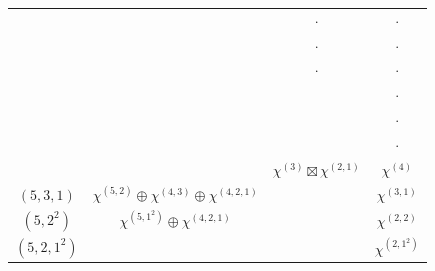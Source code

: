 \begin{figure}[H]
	\centering
	\begin{tabular}{|c|c|c|c|}
		\hline
		\makecell{$\tau$  }
		& \makecell{$\mathbb{C}_{(1^2)(1)^7}^{\tau} $} 
		& \makecell{$\mathbb{C}_{(1^2)^3(1)^3}^{\tau} $}
		&\makecell{$\mathbb{C}_{(1^2)^4(1)}^{\tau}   $}   \\
		\hline
		\makecell{$(8,1)$} & \makecell{$\chi^{(7)}$} &$\cdot$&$\cdot$\\ 
		\hline
		\makecell{$(7,2)$} & \makecell{$\chi^{(6,1)}$} &$\cdot$&$\cdot$\\ \hline
		\makecell{$(7,1^2)$} & \makecell{$\chi^{(7)}\oplus \chi^{(6,1)}$} &$\cdot$ &$\cdot$\\ \hline
		\makecell{$(6,3)$} & \makecell{$\chi^{(5,2)}$} & \makecell{$\chi^{(3)} \boxtimes \chi^{(3)}$} &$\cdot$\\ \hline
		\makecell{$(6,2,1)$} & \makecell{$\chi^{(6,1)}\oplus \chi^{(5,2)}\oplus \chi^{(5,1^2)}$ }&\makecell{$\chi^{(2,1)} \boxtimes \chi^{(3)}$}&$\cdot$\\ \hline
		\makecell{$(6,1^3)$} &\makecell{ $\chi^{(6,1)}\oplus \chi^{(5,1^2)}$} &\makecell{$\chi^{(1^3)} \boxtimes \chi^{(3)}$}& $\cdot$\\ \hline
		\makecell{$(5,4)$} & \makecell{$\chi^{(4,3)}$} &  $\chi^{(3)}\boxtimes \chi^{(2,1)}$  &$\chi^{(4)}$\\ \hline
		$(5,3,1)$ & $\chi^{(5,2)}\oplus \chi^{(4,3)}\oplus \chi^{(4,2,1)}$ &\makecell{$\substack{ (\chi^{(3)} \boxtimes \chi^{(3)})\oplus ( \chi^{(2,1)} \boxtimes \chi^{(3)}) \\ \oplus (\chi^{(3)} \boxtimes \chi^{(2,1)})\oplus (\chi^{(2,1)} \boxtimes \chi^{(2,1)})}$}& $\chi^{(3,1)}$
		\\ \hline
		$(5,2^2)$ & $\chi^{(5,1^2)}\oplus \chi^{(4,2,1)}$ &\makecell{$\substack{  ( \chi^{(2,1)} \boxtimes \chi^{(3)}) \\ \oplus (\chi^{(1^3)} \boxtimes \chi^{(3)})\oplus (\chi^{(2,1)} \boxtimes \chi^{(2,1)})}$}&$\chi^{(2,2)}$\\ \hline
		$(5,2,1^2)$ & \makecell{$\substack{\chi^{(5,2)}\oplus \chi^{(5,1^2)} \\ \oplus \chi^{(4,2,1)}\oplus \chi^{(4,1^3)}}$} &
		\makecell{$\substack{ (\chi^{(3)} \boxtimes \chi^{(3)})\oplus2 ( \chi^{(2,1)} \boxtimes \chi^{(3)}) \\ \oplus (\chi^{(1^3)}\boxtimes \chi^{(3)})\oplus (\chi^{(2,1)} \boxtimes \chi^{(2,1)})\\ \oplus (\chi^{(1^3)} \boxtimes \chi^{(2,1)})}$}
		&$\chi^{(2,1^2)}$ \\ \hline

\end{tabular}
\end{figure}
